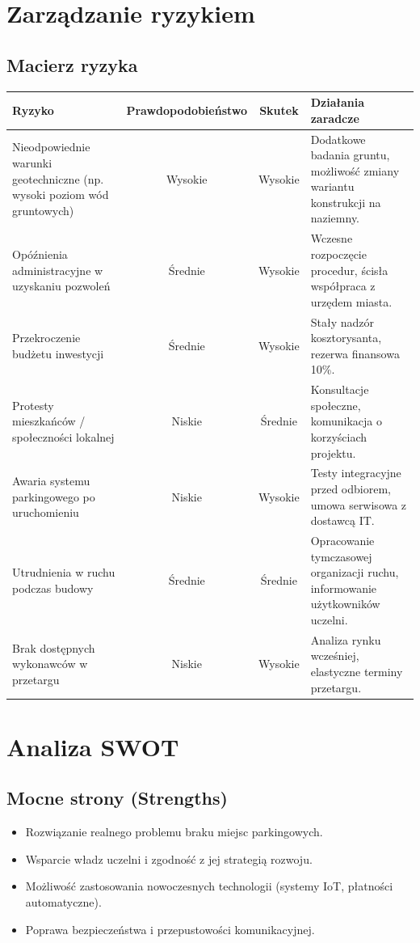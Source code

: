 \documentclass[a4paper,12pt]{article}
\begin{document}
\section{Zarządzanie ryzykiem}
\subsection*{Macierz ryzyka}
\begin{center}
\renewcommand{\arraystretch}{1.3}
\begin{tabular}{|p{4.5cm}|c|c|p{5cm}|}
\hline
\textbf{Ryzyko} & \textbf{Prawdopodobieństwo} & \textbf{Skutek} & \textbf{Działania zaradcze} \\
\hline
Nieodpowiednie warunki geotechniczne (np. wysoki poziom wód gruntowych) & Wysokie & Wysokie & Dodatkowe badania gruntu, możliwość zmiany wariantu konstrukcji na naziemny. \\
\hline
Opóźnienia administracyjne w uzyskaniu pozwoleń & Średnie & Wysokie & Wczesne rozpoczęcie procedur, ścisła współpraca z urzędem miasta. \\
\hline
Przekroczenie budżetu inwestycji & Średnie & Wysokie & Stały nadzór kosztorysanta, rezerwa finansowa 10\%. \\
\hline
Protesty mieszkańców / społeczności lokalnej & Niskie & Średnie & Konsultacje społeczne, komunikacja o korzyściach projektu. \\
\hline
Awaria systemu parkingowego po uruchomieniu & Niskie & Wysokie & Testy integracyjne przed odbiorem, umowa serwisowa z dostawcą IT. \\
\hline
Utrudnienia w ruchu podczas budowy & Średnie & Średnie & Opracowanie tymczasowej organizacji ruchu, informowanie użytkowników uczelni. \\
\hline
Brak dostępnych wykonawców w przetargu & Niskie & Wysokie & Analiza rynku wcześniej, elastyczne terminy przetargu. \\
\hline
\end{tabular}
\end{center}

\section{Analiza SWOT}
\subsection*{Mocne strony (Strengths)}
\begin{itemize}
    \item Rozwiązanie realnego problemu braku miejsc parkingowych.
    \item Wsparcie władz uczelni i zgodność z jej strategią rozwoju.
    \item Możliwość zastosowania nowoczesnych technologii (systemy IoT, płatności automatyczne).
    \item Poprawa bezpieczeństwa i przepustowości komunikacyjnej.
\end{itemize}
\end{document}
